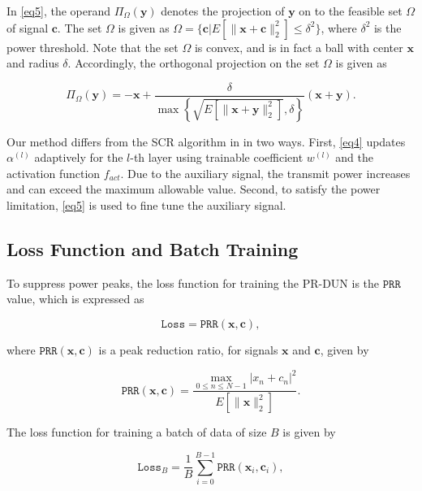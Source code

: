 \documentclass[conference]{IEEEtran}
\begin{document}
In \eqref{eq5}, the operand $\Pi_\Omega(\mathbf{y})$ denotes the projection of $\mathbf{y}$ on to the feasible set $\Omega$ of signal $\mathbf{c}$. The set $\Omega$ is given as $\Omega = \{\mathbf{c} | E\left[\|\mathbf{x} + \mathbf{c}\|_2^2\right] \leqslant \delta^2\}$, where $\delta^2$ is the power threshold. Note that the set $\Omega$ is convex, and is in fact a ball with center $\mathbf{x}$ and radius $\delta$. Accordingly, the orthogonal projection on the set $\Omega$ is given as

\begin{equation}
\Pi_\Omega(\mathbf{y}) = -\mathbf{x} + \frac{\delta}{\max \left\{ \sqrt{E\left[\|\mathbf{x} + \mathbf{y}\|_2^2\right]}, \delta \right\}} (\mathbf{x} + \mathbf{y}) .
\label{eq6}
\end{equation}

Our method differs from the SCR algorithm in \cite{b1} in two ways. First, \eqref{eq4} updates $\alpha^{(l)}$ adaptively for the $l$-th layer using trainable coefficient $w^{(l)}$ and the activation function $f_{act}$. Due to the auxiliary signal, the transmit power increases and can exceed the maximum allowable value. Second, to satisfy the power limitation, \eqref{eq5} is used to fine tune the auxiliary signal.

\subsection{Loss Function and Batch Training}
To suppress power peaks, the loss function for training the PR-DUN is the $\mathtt{PRR}$ value, which is expressed as

\begin{equation}
\mathtt{Loss} = \mathtt{PRR}(\mathbf{x}, \mathbf{c}),
\label{eq7}
\end{equation}

where $\mathtt{PRR}(\mathbf{x}, \mathbf{c})$ is a peak reduction ratio, for signals $\mathbf{x}$ and $\mathbf{c}$, given by

\begin{equation}
\mathtt{PRR}(\mathbf{x}, \mathbf{c}) = \frac{\max_{0\leqslant n\leqslant N-1} |x_n + c_n|^2}{E\left[\|\mathbf{x}\|_2^2\right]} .
\end{equation}

The loss function for training a batch of data of size $B$ is given by

\begin{equation}
\mathtt{Loss}_B = \frac{1}{B} \sum_{i=0}^{B-1} \mathtt{PRR}(\mathbf{x}_i, \mathbf{c}_i),
\label{eq8}
\end{equation}
\end{document}
